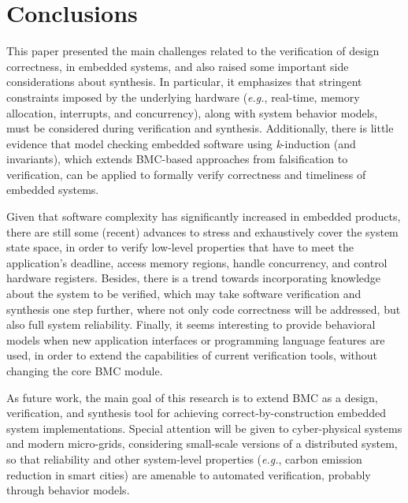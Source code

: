 \documentclass{acm_sen_article}
\begin{document}
{{%
\section{Conclusions}
\label{conclusions}

This paper presented the main challenges related to the verification of design correctness, in embedded systems, and also raised some important side considerations about synthesis. In particular, it emphasizes that stringent constraints imposed by the underlying hardware ({\it e.g.}, real-time, memory allocation, interrupts, and concurrency), along with system behavior models, must be considered during verification and synthesis. Additionally, there is little evidence that model checking embedded software using \textit{k}-induction (and invariants), which
extends BMC-based approaches from falsification to verification, can be applied to formally verify correctness and timeliness of embedded systems. 

Given that software complexity has significantly increased in embedded products, there are still some (recent) advances to stress and exhaustively cover the system state space, in order to verify low-level properties that have to meet the application's deadline, access memory regions, handle concurrency, and control hardware registers. Besides, there is a trend towards incorporating knowledge about the system to be verified, which may take software verification and synthesis one step further, where not only code correctness will be addressed, but also full system reliability. Finally, it seems interesting to provide behavioral models when new application interfaces or programming language features are used, in order to extend the capabilities of current verification tools, without changing the core BMC module.

As future work, the main goal of this research is to extend BMC as a design, verification, and synthesis tool for achieving correct-by-construction embedded system implementations. Special attention will be given to cyber-physical systems and modern micro-grids, considering small-scale versions of a distributed system, so that reliability and other system-level properties ({\it e.g.}, carbon emission reduction in smart cities) are amenable to automated verification, probably through behavior models.





}}
\end{document}
